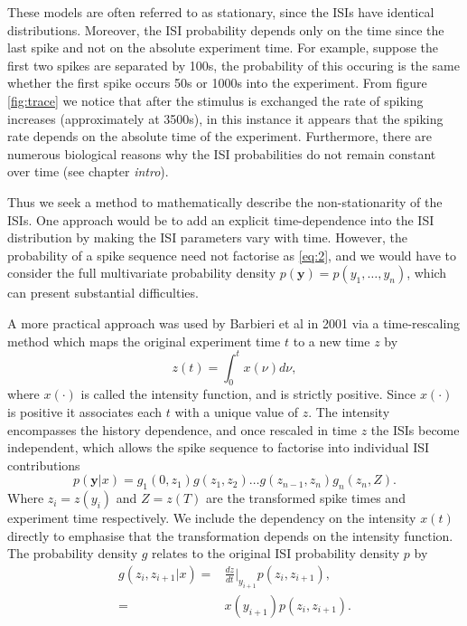 \documentclass[../main.tex]{subfiles}
\begin{document}
These models are often referred to as stationary, since the ISIs have identical distributions. Moreover, the ISI probability depends only on the time since the last spike and not on the absolute experiment time. For example, suppose the first two spikes are separated by 100s, the probability of this occuring is the same whether the first spike occurs 50s or 1000s into the experiment. From figure \ref{fig:trace} we notice that after the stimulus is exchanged the rate of spiking increases (approximately at 3500s), in this instance it appears that the spiking rate depends on the absolute time of the experiment. Furthermore, there are numerous biological reasons why the ISI probabilities do not remain constant over time (see chapter {\it intro}). 

Thus we seek a method to mathematically describe the non-stationarity of the ISIs. One approach would be to add an explicit time-dependence into the ISI distribution by making the ISI parameters vary with time. However, the probability of a spike sequence need not factorise as \eqref{eq:2}, and we would have to consider the full multivariate probability density $p(\mathbf{y}) = p(y_1, \dots,y_n)$, which can present substantial difficulties.

A more practical approach was used by Barbieri et al in 2001 \cite{IntFn} via a time-rescaling method which maps the original experiment time $t$ to a new time $z$ by 
\begin{equation}\label{eq:3}
z(t) = \int^t_0 x(\nu ) d\nu, 
\end{equation}
where $x(\cdot)$ is called the intensity function, and is strictly positive. Since $x(\cdot)$ is positive it associates each $t$ with a unique value of $z$. The intensity encompasses the history dependence, and once rescaled in time $z$ the ISIs become independent, which allows the spike sequence to factorise into individual ISI contributions 
\begin{equation}\label{eq:4}
p(\mathbf{y} | x) = g_1(0, z_1)g(z_1, z_2) \dots g(z_{n-1},z_n) g_n(z_n, Z).
\end{equation} 
Where $z_i = z(y_i)$ and $Z = z(T)$ are the transformed spike times and experiment time respectively. We include the dependency on the intensity $x(t)$ directly to emphasise that the transformation depends on the intensity function. The probability density $g$ relates to the original ISI probability density $p$ by 
\begin{align} \label{eq:5} 
g(z_i,z_{i+1} | x) =& \frac{dz}{dt} \bigg\rvert_{y_{i+1}} p(z_i, z_{i+1}),  \\
=& x(y_{i+1}) p(z_i, z_{i+1}). \label{eq:5b}
\end{align}
\end{document}

